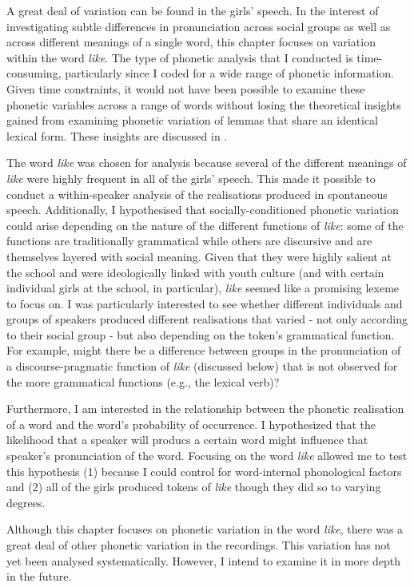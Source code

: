 \noindent A great deal of variation can be found in the girls' speech. In the interest of investigating subtle differences in pronunciation across social groups as well as across different meanings of a single word, this chapter focuses on variation within the word \textit{like}. The type of phonetic analysis that I conducted is time-consuming, particularly since I coded for a wide range of phonetic information. Given time constraints, it would not have been possible to examine these phonetic variables across a range of words without losing the theoretical insights gained from examining phonetic variation of lemmas that share an identical lexical form. These insights are discussed in .

The word \textit{like} was chosen for analysis because several of the different meanings of \textit{like} were highly frequent in all of the girls' speech. This made it possible to conduct a within-speaker analysis of the realisations produced in spontaneous speech. Additionally, I hypothesised that socially-conditioned phonetic variation could arise depending on the nature of the different functions of \textit{like}: some of the functions are traditionally grammatical while others are discursive and are themselves layered with social meaning. Given that they were highly salient at the school and were ideologically linked with youth culture (and with certain individual girls at the school, in particular), \textit{like} seemed like a promising lexeme to focus on. I was particularly interested to see whether different individuals and groups of speakers produced different realisations that varied - not only according to their social group - but also depending on the token's grammatical function. For example, might there be a difference between groups in the pronunciation of a discourse-pragmatic function of \textit{like} (discussed below) that is not observed for the more grammatical functions (e.g., the lexical verb)? 

\largerpage
Furthermore, I am interested in the relationship between the phonetic realisation of a word and the word's probability of occurrence. I hypothesized that the likelihood that a speaker will producs a certain word might influence that speaker's pronunciation of the word. Focusing on the word \textit{like} allowed me to test this hypothesis (1) because I could control for word-internal phonological factors and (2) all of the girls produced tokens of \textit{like} though they did so to varying degrees.

Although this chapter focuses on phonetic variation in the word \textit{like}, there was a great deal of other phonetic variation in the recordings. This variation has not yet been analysed systematically. However, I intend to examine it in more depth in the future. 

